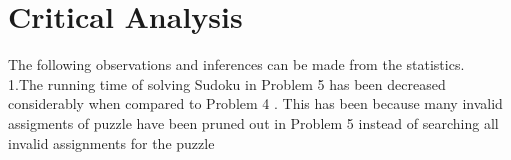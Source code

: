 \documentclass[11pt]{article}
\begin{document}
\section{  Critical Analysis }



The following observations and inferences can be made from the statistics.\\
1.The running time of solving Sudoku in Problem 5  has been decreased  considerably when compared to Problem 4 . This has been because many invalid assigments of puzzle have been pruned out in Problem 5 instead of searching  all invalid assignments for the puzzle
\end{document}
